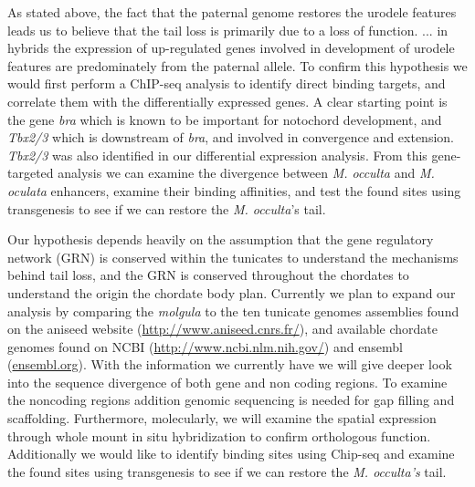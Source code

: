 As stated above, the fact that the paternal genome restores the urodele features leads us to believe that the tail loss is primarily due to a loss of function. ... in hybrids the expression of up-regulated genes involved in development of urodele features are predominately from the paternal allele. To confirm this hypothesis we would first perform a ChIP-seq analysis to identify direct binding targets, and correlate them with the differentially expressed genes.  A clear starting point is the gene \textit{bra} which is known to be important for notochord development, and \textit{Tbx2/3} which is downstream of \textit{bra}, and involved in convergence and extension.  {\em Tbx2/3} was also identified in our differential expression analysis. From this gene-targeted analysis we can examine the divergence between \textit{M. occulta} and \textit{M. oculata} enhancers, examine their binding affinities, and test the found sites using transgenesis to see if we can restore the \textit{M. occulta}'s tail.

Our hypothesis depends heavily on the assumption that the gene regulatory network (GRN) is conserved within the tunicates to understand the mechanisms behind tail loss, and the GRN is conserved throughout the chordates to understand the origin the chordate body plan. Currently we plan to expand our analysis by comparing the \textit{molgula} to the ten tunicate genomes assemblies found on the aniseed website (\url{http://www.aniseed.cnrs.fr/}), and available chordate genomes found on NCBI (\url{http://www.ncbi.nlm.nih.gov/}) and ensembl (\url{ensembl.org}). With the information we currently have we will give deeper look into the sequence divergence of both gene and non coding regions. To examine the noncoding regions addition genomic sequencing is needed for gap filling and scaffolding. Furthermore, molecularly, we will examine the spatial expression through whole mount in situ hybridization to confirm orthologous function.  Additionally we would like to identify binding sites using Chip-seq and examine the found sites using transgenesis to see if we can restore the \textit{M. occulta's} tail.
